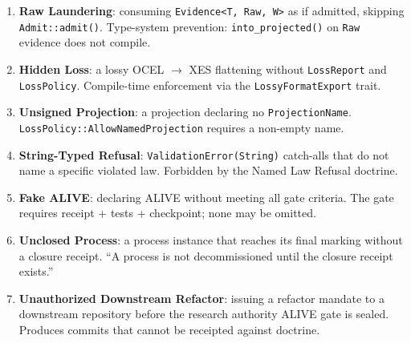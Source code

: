 \begin{enumerate}
  \item \textbf{Raw Laundering}: consuming \texttt{Evidence\textless{}T, Raw, W\textgreater{}}
    as if admitted, skipping \texttt{Admit::admit()}. Type-system prevention: \texttt{into\_projected()}
    on \texttt{Raw} evidence does not compile.
  \item \textbf{Hidden Loss}: a lossy OCEL $\to$ XES flattening without \texttt{LossReport}
    and \texttt{LossPolicy}. Compile-time enforcement via the \texttt{LossyFormatExport}
    trait.
  \item \textbf{Unsigned Projection}: a projection declaring no \texttt{ProjectionName}.
    \texttt{LossPolicy::AllowNamedProjection} requires a non-empty name.
  \item \textbf{String-Typed Refusal}: \texttt{ValidationError(String)} catch-alls that do
    not name a specific violated law. Forbidden by the Named Law Refusal doctrine.
  \item \textbf{Fake ALIVE}: declaring ALIVE without meeting all gate criteria. The gate
    requires receipt + tests + checkpoint; none may be omitted.
  \item \textbf{Unclosed Process}: a process instance that reaches its final marking without
    a closure receipt. ``A process is not decommissioned until the closure receipt exists.''
  \item \textbf{Unauthorized Downstream Refactor}: issuing a refactor mandate to a downstream
    repository before the research authority ALIVE gate is sealed. Produces commits that
    cannot be receipted against doctrine.
\end{enumerate}
